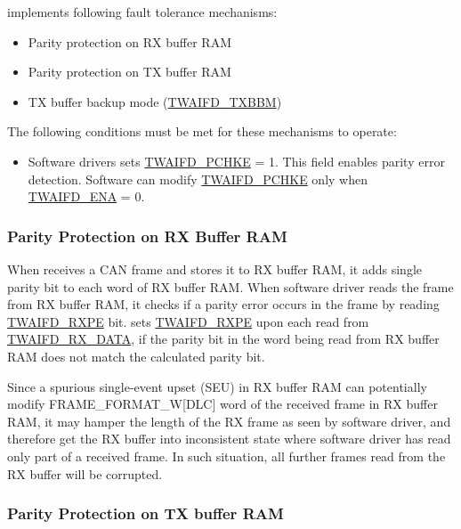 \documentclass[main\_\_EN.tex]{subfiles}
\begin{document}
\modulename{} implements following fault tolerance mechanisms:

\begin{itemize}
    \item Parity protection on RX buffer RAM
    \item Parity protection on TX buffer RAM
    \item TX buffer backup mode (\hyperref[fielddesc:TWAIFDTXBBM]{TWAIFD\_TXBBM})
\end{itemize}

The following conditions must be met for these mechanisms to operate:

\begin{itemize}
    \item Software drivers sets \hyperref[fielddesc:TWAIFDPCHKE]{TWAIFD\_PCHKE} = 1. This field enables parity error detection. Software can modify \hyperref[fielddesc:TWAIFDPCHKE]{TWAIFD\_PCHKE} only when \hyperref[fielddesc:TWAIFDENA]{TWAIFD\_ENA} = 0.
\end{itemize}

\subsubsection{Parity Protection on RX Buffer RAM}

When \modulename{} receives a CAN frame and stores it to RX buffer RAM, it adds single parity bit to each word of RX buffer RAM. When software driver reads the frame from RX buffer RAM, it checks if a parity error occurs in the frame by reading \hyperref[fielddesc:TWAIFDRXPE]{TWAIFD\_RXPE} bit. \modulename{} sets \hyperref[fielddesc:TWAIFDRXPE]{TWAIFD\_RXPE} upon each read from \hyperref[regdesc:TWAIFDRXDATAREG]{TWAIFD\_RX\_DATA}, if the parity bit in the word being read from RX buffer RAM does not match the calculated parity bit.

Since a spurious single-event upset (SEU) in RX buffer RAM can potentially modify FRAME\_FORMAT\_W[DLC] word of the received frame in RX buffer RAM, it may hamper the length of the RX frame as seen by software driver, and therefore get the RX buffer into inconsistent state where software driver has read only part of a received frame. In such situation, all further frames read from the RX buffer will be corrupted.


\subsubsection{Parity Protection on TX buffer RAM}
\label{sec:twai-parity-protect-tx-buffer}
\end{document}
